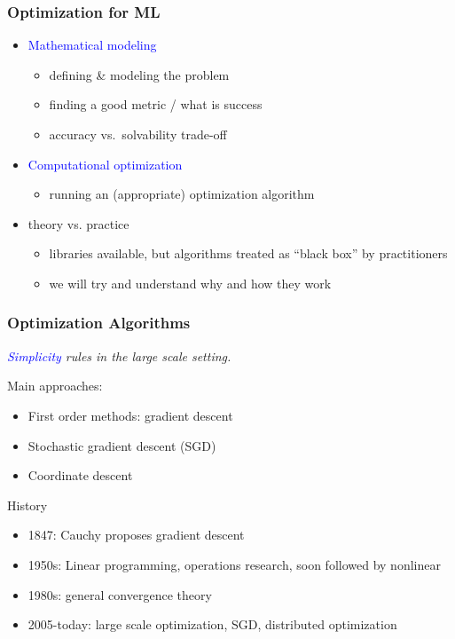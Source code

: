 \documentclass{beamer}
\begin{document}
\begin{frame}
  \frametitle{Optimization for ML}
  \begin{itemize}
    \item \textcolor{blue}{Mathematical modeling}
          \begin{itemize}
            \item defining \& modeling the problem
            \item finding a good metric / what is success
            \item accuracy vs.\ solvability trade-off
          \end{itemize}
    \item \textcolor{blue}{Computational optimization}
         \begin{itemize}
           \item running an (appropriate) optimization algorithm
         \end{itemize}
    \item theory vs. practice
          \begin{itemize}
            \item libraries available, but algorithms treated as ``black box'' by practitioners
            \item we will try and understand why and how they work
          \end{itemize}
  \end{itemize}
\end{frame}


\begin{frame}
  \frametitle{Optimization Algorithms}
  \begin{center}
    \textit{\textcolor{blue}{Simplicity} rules in the large scale setting.}
  \end{center}
  Main approaches:
  \begin{itemize}
    \item First order methods: gradient descent
    \item Stochastic gradient descent (SGD)
    \item Coordinate descent
  \end{itemize}

  History
  \begin{itemize}
    \item 1847: Cauchy proposes gradient descent
    \item 1950s: Linear programming, operations research, soon followed by nonlinear
    \item 1980s: general convergence theory
    \item 2005-today: large scale optimization, SGD, distributed optimization
  \end{itemize}
\end{frame}
\end{document}
